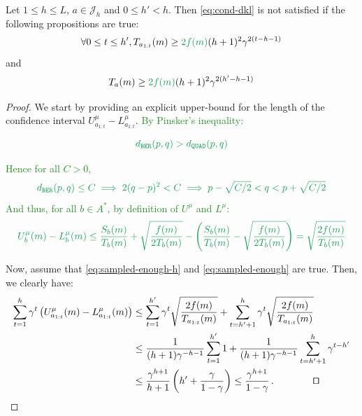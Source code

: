 \documentclass[runningheads, envcountsame, a4paper]{llncs}
\newcommand{\diff}[1]{\textcolor{ForestGreen}{#1}}
\begin{document}
\begin{lemma}
\label{lemma:ci-length}
Let $1 \leq h \leq L$, $a\in \mathcal{J}_h$ and $0 \leq h' < h$. Then  \eqref{eq:cond-dkl} is not satisfied if the following propositions are true:
\begin{equation}
\label{eq:sampled-enough-h}
   \forall 0\leq t\leq h', T_{a_{1:t}}(m) \geq \diff{2f(m)}(h+1)^2\gamma^{2(t-h-1)}
\end{equation}
and
\begin{equation}
\label{eq:sampled-enough}
   T_{a}(m) \geq \diff{2f(m)}(h+1)^2\gamma^{2(h'-h-1)}
\end{equation}
\end{lemma}
\begin{proof}
We start by providing an explicit upper-bound for the length of the confidence interval $U^{\mu}_{a_{1:t}} - L^{\mu}_{a_{1:t}}$. \diff{By Pinsker's inequality:}
 
\begin{equation*}
    \diff{\dber(p, q) > \dquad(p, q)}
\end{equation*}

\diff{Hence for all $C>0$, }
\begin{equation*}
    \diff{\dber(p, q) \leq C   \implies 2(q - p)^2 < C  \implies p - \sqrt{C/2} < q < p + \sqrt{C/2}}
\end{equation*}
\diff{And thus, for all $b\in A^*$, by definition of $U^{\mu}$ and $L^{\mu}$:}
\begin{align*}
    \diff{U^{\mu}_{b}(m) - L^{\mu}_{b}(m) \leq \frac{S_b(m)}{T_b(m)} + \sqrt{\frac{f(m)}{2T_b(m)}} -  \left(\frac{S_b(m)}{T_b(m)} - \sqrt{\frac{f(m)}{2T_b(m)}}\right) 
    = \sqrt{\frac{2f(m)}{T_b(m)}}}
\end{align*}

Now, assume that \eqref{eq:sampled-enough-h} and \eqref{eq:sampled-enough} are true. Then, we clearly have:
\begin{align*}
    \sum_{t=1}^h \gamma^t\left(U^{\mu}_{a_{1:t}}(m) - L^{\mu}_{a_{1:t}}(m)\right) &\leq \sum_{t=1}^{h'} \gamma^t \sqrt{\frac{2f(m)}{T_{a_{1:t}}(m)}} + \sum_{t=h'+1}^h \gamma^t \sqrt{\frac{2f(m)}{T_{a_{1:t}}(m)}} \\
    &\leq \frac{1}{(h+1)\gamma^{-h-1}} \sum_{t=1}^{h'} 1 + \frac{1}{(h+1)\gamma^{-h-1}} \sum_{t=h'+1}^h \gamma^{t-h'}  \\
    &\leq \frac{\gamma^{h+1}}{h+1} \left( h' + \frac{\gamma}{1-\gamma} \right)\leq \frac{\gamma^{h+1}}{1-\gamma}\,.\qquad\qquad\qed
\end{align*}
\end{proof}
\end{document}
